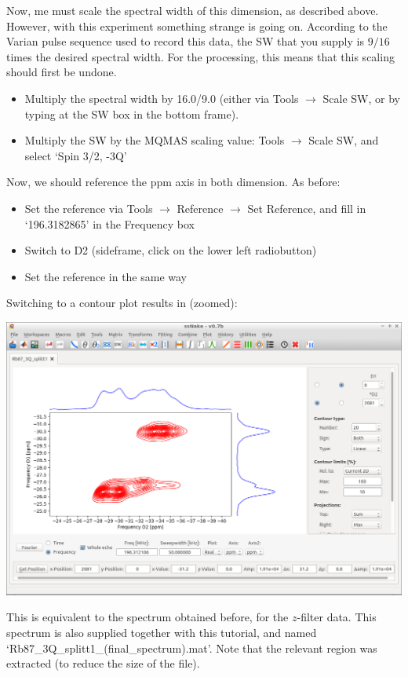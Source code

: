 \documentclass[11pt,a4paper]{article}
\begin{document}
Now, me must scale the spectral width of this dimension, as described above.
However, with this experiment something strange is going on.
According to the Varian pulse sequence used to record this data, the SW that you supply is $9/16$ times the desired spectral width.
For the processing, this means that this scaling should first be undone.

\begin{itemize}
	\item Multiply the spectral width by 16.0/9.0 (either via Tools  $\longrightarrow$ Scale SW, or
	  by typing at the SW box in the bottom frame).
	\item Multiply the SW by the MQMAS scaling value: Tools  $\longrightarrow$ Scale SW, and select `Spin 3/2, -3Q'
\end{itemize}
Now, we should reference the ppm axis in both dimension.
As before:
\begin{itemize}
  \item Set the reference via Tools $\longrightarrow$ Reference $\longrightarrow$ Set Reference, and
	 fill in `196.3182865' in the Frequency box
	\item Switch to D2 (sideframe, click on the lower left radiobutton)
	\item Set the reference in the same way
\end{itemize}
Switching to a contour plot results in (zoomed):
\begin{center}
\includegraphics[width=0.8\linewidth]{Figs/Fig11.png}
\end{center}
This is equivalent to the spectrum obtained before, for the $z$-filter data.
This spectrum is also supplied together with this tutorial, and named `Rb87\_3Q\_splitt1\_(final\_spectrum).mat'.
Note that the relevant region was extracted (to reduce the size of the file).
\end{document}
